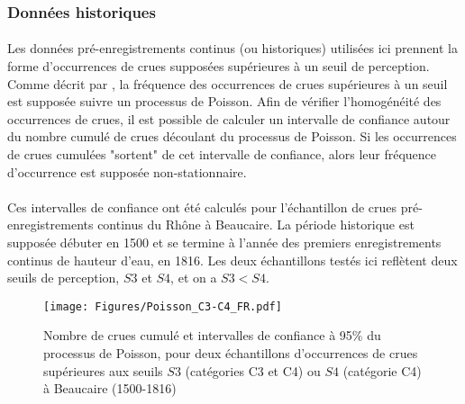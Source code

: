 \documentclass[11pt]{article}
\begin{document}

		
	\subsubsection{Données historiques}
	
	\paragraph{} Les données pré-enregistrements continus (ou historiques) utilisées ici prennent la forme d'occurrences de crues supposées supérieures à un seuil de perception. Comme décrit par \citet{lang_towards_1999}, la fréquence des occurrences de crues supérieures à un seuil est supposée suivre un processus de Poisson. Afin de vérifier l'homogénéité des occurrences de crues, il est possible de calculer un intervalle de confiance autour du nombre cumulé de crues découlant du processus de Poisson. Si les occurrences de crues cumulées "sortent" de cet intervalle de confiance, alors leur fréquence d'occurrence est supposée non-stationnaire. 
	
	\paragraph{} Ces intervalles de confiance ont été calculés pour l'échantillon de crues pré-enregistrements continus du Rhône à Beaucaire. La période historique est supposée débuter en 1500 et se termine à l'année des premiers enregistrements continus de hauteur d'eau, en 1816. Les deux échantillons testés ici reflètent deux seuils de perception, $S3$ et $S4$, et on a $S3 < S4$. 

	\begin{figure}[h]
		\centering
		\texttt{[image: Figures/Poisson\_C3-C4\_FR.pdf]}	
		\caption{Nombre de crues cumulé et intervalles de confiance à 95\% du processus de 						Poisson, pour deux échantillons d'occurrences de crues supérieures aux seuils $S3$ (catégories C3 et C4) ou $S4$ (catégorie C4) à Beaucaire (1500-1816)}
		\label{fig:Poisson_C3-C4}
	\end{figure}		
	
\end{document}

